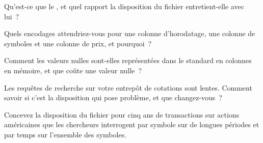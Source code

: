 \begin{interviewq}\label{iq:pl:columnar-formats:2}
Qu'est-ce que le , et quel rapport la disposition du fichier entretient-elle avec lui~?
\end{interviewq}

\begin{interviewq}\label{iq:pl:columnar-formats:3}
Quels encodages attendriez-vous pour une colonne d'horodatage, une colonne de symboles et une colonne de prix, et pourquoi~?
\end{interviewq}

\begin{interviewq}\label{iq:pl:columnar-formats:4}
Comment les valeurs nulles sont-elles représentées dans le standard en colonnes en mémoire, et que coûte une valeur nulle~?
\end{interviewq}

\begin{interviewq}\label{iq:pl:columnar-formats:5}
Les requêtes de recherche sur votre entrepôt de cotations sont lentes. Comment savoir si c'est la disposition qui pose problème, et que changez-vous~?
\end{interviewq}

\begin{interviewq}\label{iq:pl:columnar-formats:6}
Concevez la disposition du fichier pour cinq ans de transactions sur actions américaines que les chercheurs interrogent par symbole sur de longues périodes et par temps sur
l'ensemble des symboles.
\end{interviewq}
